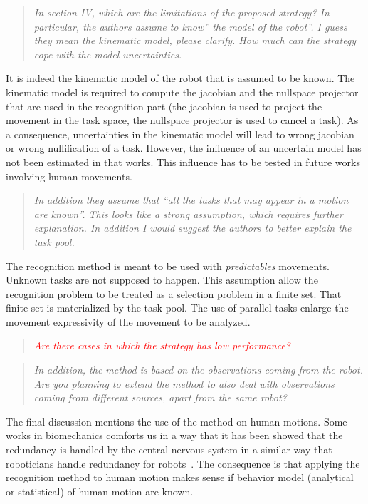 \documentclass[11pt]{article}
\newcommand{\red}[1]{{\textcolor{red}{#1}}}
\begin{document}
\begin{quote}
\textit{
  In section IV, which are the limitations of the proposed strategy? In particular, the authors assume to know” the model of the robot”.  I guess they mean the kinematic model, please clarify. How much can the strategy cope with the model uncertainties.
}
\end{quote}
It is indeed the kinematic model of the robot that is assumed to be known. The kinematic model is
required to compute the jacobian and the nullspace projector that are used in the recognition part
(the jacobian is used to project the movement in the task space, the nullspace projector is used
 to cancel a task).
As a consequence, uncertainties in the kinematic model will lead to wrong jacobian or wrong
nullification of a task. However, the influence
of an uncertain model has not been estimated in that works. 
This influence has to be tested in future works involving human movements.

\begin{quote}
\textit{
 In addition they assume that “all the tasks that may appear in a motion are known”.  This looks like a strong assumption, which requires further explanation.
  In addition I would suggest the authors to better explain the task pool.
}
\end{quote}
The recognition method is meant to be used with \emph{predictables} movements.
Unknown tasks are not supposed to happen. This assumption allow the 
recognition problem to be treated as a selection problem in a finite
set.
That finite set is materialized by the task pool.
The use of parallel tasks enlarge the movement expressivity of the movement to be analyzed.

\begin{quote}
\textit{
 \red{Are there cases in which the strategy has low performance?}
}
 \end{quote}

\begin{quote}
\textit{
  In addition, the method is based on the observations coming from the robot.  Are you planning to extend the method to also deal with observations coming from different sources, apart from the same robot? 
}
\end{quote}
The final discussion mentions the use of the method on human motions.
Some works in biomechanics comforts us in a way that it has been showed
that the redundancy is handled by the central nervous system in a similar 
way that roboticians handle redundancy for robots~\cite{jacquierbret09}.
The consequence is that applying the recognition method to human motion makes
sense if behavior model (analytical or statistical) of human motion are known.
\end{document}
